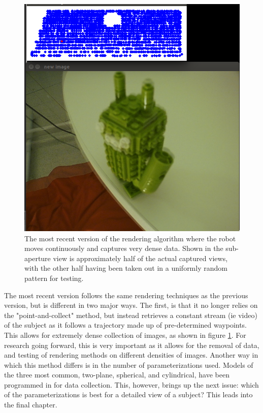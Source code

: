 \documentclass[12pt]{report}
\begin{document}
\begin{figure}[!ht]
	\centering
	\includegraphics[scale=0.45]{continuous_collect.png}
	\caption{The most recent version of the rendering algorithm where the robot moves continuously and captures very dense data. Shown in the sub-aperture view is approximately half of the actual captured views, with the other half having been taken out in a uniformly random pattern for testing.}
	\label{fig:const_move}
\end{figure}

The most recent version follows the same rendering techniques as the previous version, but is different in two major ways. The first, is that it no longer relies on the "point-and-collect" method, but instead retrieves a constant stream (ie video) of the subject as it follows a trajectory made up of pre-determined waypoints. This allows for extremely dense collection of images, as shown in figure \ref{fig:const_move}. For research going forward, this is very important as it allows for the removal of data, and testing of rendering methods on different densities of images. Another way in which this method differs is in the number of parameterizations used. Models of the three most common, two-plane, spherical, and cylindrical, have been programmed in for data collection. This, however, brings up the next issue: which of the parameterizations is best for a detailed view of a subject? This leads into the final chapter.
\end{document}
